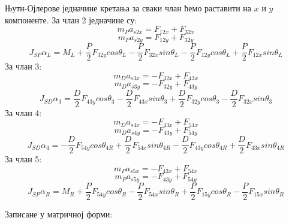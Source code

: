 \documentclass[12pt]{article}
\begin{document}
Њутн-Ојлерове једначине кретања за сваки члан ћемо раставити на $x$ и $y$ компоненте. За члан 2 једначине су:
\begin{equation}
    m_P a_{s2x} = F_{12x}+F_{32x}
\end{equation}
\begin{equation}
    m_P a_{s2y} = F_{12y}+F_{32y}
\end{equation}
\begin{equation}
    J_{SP} \alpha_L = M_L + \dfrac{P}{2}F_{32y}cos\theta_L - \dfrac{P}{2}F_{32x}sin\theta_L - \dfrac{P}{2}F_{12y}cos\theta_L + \dfrac{P}{2}F_{12x}sin\theta_L
\end{equation}
За члан 3:
\begin{equation}
    m_D a_{s3x} = -F_{32x}+F_{43x}
\end{equation}
\begin{equation}
    m_D a_{s3y} = -F_{32y}+F_{43y}
\end{equation}
\begin{equation}
    J_{SD} \alpha_3 = \dfrac{D}{2}F_{43y}cos\theta_3 - \dfrac{D}{2}F_{43x}sin\theta_3 + \dfrac{D}{2}F_{32y}cos\theta_3 - \dfrac{D}{2}F_{32x}sin\theta_3
\end{equation}
За члан 4:
\begin{equation}
    m_D a_{s4x} = -F_{43x}+F_{54x}
\end{equation}
\begin{equation}
    m_D a_{s4y} = -F_{43y}+F_{54y}
\end{equation}
\begin{equation}
    J_{SD} \alpha_4 = - \dfrac{D}{2}F_{54y}cos\theta_{4R} + \dfrac{D}{2}F_{54x}sin\theta_{4R} - \dfrac{D}{2}F_{43y}cos\theta_{4R} + \dfrac{D}{2}F_{43x}sin\theta_{4R}
\end{equation}
За члан 5:
\begin{equation}
    m_P a_{s5x} = -F_{43x}+F_{54x}
\end{equation}
\begin{equation}
    m_P a_{s5y} = -F_{43y}+F_{54y}
\end{equation}
\begin{equation}
    J_{SP} \alpha_R = M_R + \dfrac{P}{2}F_{54y}cos\theta_R - \dfrac{P}{2}F_{54x}sin\theta_R + \dfrac{P}{2}F_{15y}cos\theta_R - \dfrac{P}{2}F_{15x}sin\theta_R
\end{equation}

Записане у матричној форми:
\end{document}
